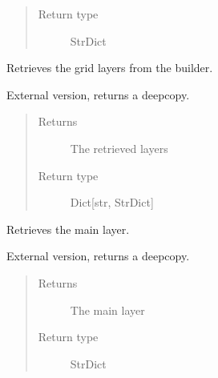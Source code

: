 \documentclass[letterpaper,10pt,english]{sphinxmanual}
\begin{document}
\begin{fulllineitems}
\begin{fulllineitems}
\begin{quote}
\begin{description}
\item[{Return type}] \leavevmode
\sphinxAtStartPar
StrDict

\end{description}\end{quote}

\end{fulllineitems}


\begin{fulllineitems}
\label{\detokenize{builder:geohexviz.builder.PlotBuilder.get_grids}}
\sphinxAtStartPar
Retrieves the grid layers from the builder.

\sphinxAtStartPar
External version, returns a deepcopy.
\begin{quote}\begin{description}
\item[{Returns}] \leavevmode
\sphinxAtStartPar
The retrieved layers

\item[{Return type}] \leavevmode
\sphinxAtStartPar
Dict{[}str, StrDict{]}

\end{description}\end{quote}

\end{fulllineitems}


\begin{fulllineitems}
\label{\detokenize{builder:geohexviz.builder.PlotBuilder.get_hexbin}}
\sphinxAtStartPar
Retrieves the main layer.

\sphinxAtStartPar
External version, returns a deepcopy.
\begin{quote}\begin{description}
\item[{Returns}] \leavevmode
\sphinxAtStartPar
The main layer

\item[{Return type}] \leavevmode
\sphinxAtStartPar
StrDict


\end{description}
\end{quote}
\end{fulllineitems}
\end{fulllineitems}
\end{document}
